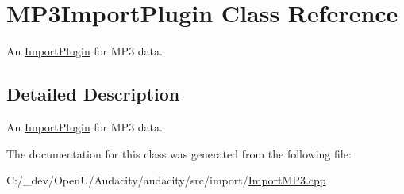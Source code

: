 \hypertarget{class_m_p3_import_plugin}{}\section{M\+P3\+Import\+Plugin Class Reference}
\label{class_m_p3_import_plugin}


An \hyperlink{class_import_plugin}{Import\+Plugin} for M\+P3 data.  




\subsection{Detailed Description}
An \hyperlink{class_import_plugin}{Import\+Plugin} for M\+P3 data. 

The documentation for this class was generated from the following file\+:\begin{DoxyCompactItemize}
\item 
C\+:/\+\_\+dev/\+Open\+U/\+Audacity/audacity/src/import/\hyperlink{_import_m_p3_8cpp}{Import\+M\+P3.\+cpp}\end{DoxyCompactItemize}
